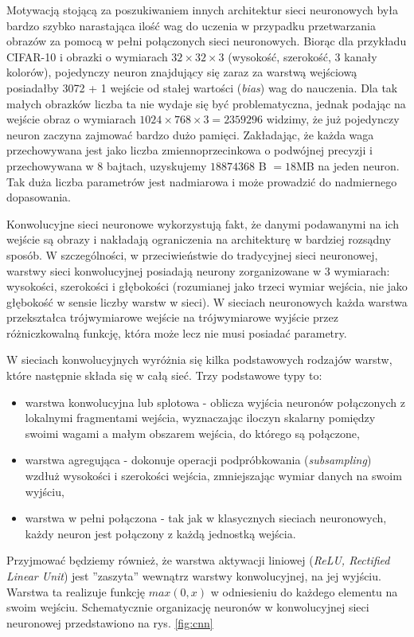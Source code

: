 Motywacją stojącą za poszukiwaniem innych architektur sieci neuronowych była bardzo szybko narastająca ilość wag do uczenia w przypadku przetwarzania obrazów za pomocą w pełni połączonych sieci neuronowych.
Biorąc dla przykładu CIFAR-10 i obrazki o wymiarach $ 32 \times 32 \times 3$ (wysokość, szerokość, 3 kanały kolorów), pojedynczy neuron znajdujący się zaraz za warstwą wejściową posiadałby 3072 + 1 wejście od stałej wartości (\textit{bias}) wag do nauczenia.
Dla tak małych obrazków liczba ta nie wydaje się być problematyczna, jednak podając na wejście obraz o wymiarach $1024 \times 768 \times 3 = 2359296$ widzimy, że już pojedynczy neuron zaczyna zajmować bardzo dużo pamięci.
Zakładając, że każda waga przechowywana jest jako liczba zmiennoprzecinkowa o podwójnej precyzji i przechowywana w 8 bajtach, uzyskujemy $18874368$ B $= 18$MB na jeden neuron.
Tak duża liczba parametrów jest nadmiarowa i może prowadzić do nadmiernego dopasowania.

Konwolucyjne sieci neuronowe wykorzystują fakt, że danymi podawanymi na ich wejście są obrazy i nakładają ograniczenia na architekturę w bardziej rozsądny sposób.
W szczególności, w przeciwieństwie do tradycyjnej sieci neuronowej, warstwy sieci konwolucyjnej posiadają neurony zorganizowane w 3 wymiarach: wysokości, szerokości i głębokości (rozumianej jako trzeci wymiar wejścia, nie jako głębokość w sensie liczby warstw w sieci).
W sieciach neuronowych każda warstwa przekształca trójwymiarowe wejście na trójwymiarowe wyjście przez różniczkowalną funkcję, która może lecz nie musi posiadać parametry.

W sieciach konwolucyjnych wyróżnia się kilka podstawowych rodzajów warstw, które następnie składa się w całą sieć.
Trzy podstawowe typy to:
\begin{itemize}
	\item warstwa konwolucyjna lub splotowa - oblicza wyjścia neuronów połączonych z lokalnymi fragmentami wejścia, wyznaczając iloczyn skalarny pomiędzy swoimi wagami a małym obszarem wejścia, do którego są połączone,
	\item warstwa agregująca - dokonuje operacji podpróbkowania (\textit{subsampling}) wzdłuż wysokości i szerokości wejścia, zmniejszając wymiar danych na swoim wyjściu,
	\item warstwa w pełni połączona - tak jak w klasycznych sieciach neuronowych, każdy neuron jest połączony z każdą jednostką wejścia.
\end{itemize}

Przyjmować będziemy również, że warstwa aktywacji liniowej (\textit{ReLU, Rectified Linear Unit}) jest ''zaszyta'' wewnątrz warstwy konwolucyjnej, na jej wyjściu.
Warstwa ta realizuje funkcję $max(0, x)$ w odniesieniu do każdego elementu na swoim wejściu. \cite{cs231n}
Schematycznie organizację neuronów w konwolucyjnej sieci neuronowej przedstawiono na rys. \ref{fig:cnn}

